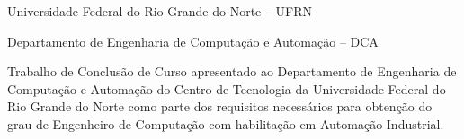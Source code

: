 

\instituicao
{
	Universidade Federal do Rio Grande do Norte -- UFRN \par 
	Departamento de Engenharia de Computação e Automação -- DCA
}
	
\comentario
{
Trabalho de Conclusão de Curso apresentado ao Departamento de Engenharia de Computação e Automação do Centro de Tecnologia da Universidade Federal do Rio Grande do Norte como parte dos requisitos necessários para obtenção do grau de Engenheiro de Computação com habilitação em Automação Industrial.
}
		
\data{\today}
	
\folhaderosto